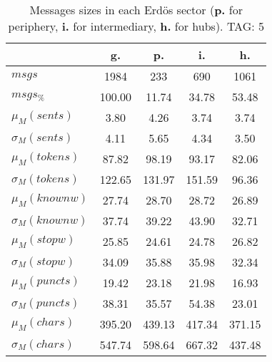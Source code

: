 \begin{table}[h!]
\begin{center}
\begin{tabular}{| l | c | c | c | c |}\hline
 & g. & p. & i. & h. \\\hline
$msgs$ & 1984  & 233  & 690  & 1061 \\\hline
$msgs_{\%}$ & 100.00  & 11.74  & 34.78  & 53.48 \\\hline
$\mu_M(sents)$ & 3.80  & 4.26  & 3.74  & 3.74 \\\hline
$\sigma_M(sents)$ & 4.11  & 5.65  & 4.34  & 3.50 \\\hline
$\mu_M(tokens)$ & 87.82  & 98.19  & 93.17  & 82.06 \\\hline
$\sigma_M(tokens)$ & 122.65  & 131.97  & 151.59  & 96.36 \\\hline
$\mu_M(knownw)$ & 27.74  & 28.70  & 28.72  & 26.89 \\\hline
$\sigma_M(knownw)$ & 37.74  & 39.22  & 43.90  & 32.71 \\\hline
$\mu_M(stopw)$ & 25.85  & 24.61  & 24.78  & 26.82 \\\hline
$\sigma_M(stopw)$ & 34.09  & 35.88  & 35.98  & 32.34 \\\hline
$\mu_M(puncts)$ & 19.42  & 23.18  & 21.98  & 16.93 \\\hline
$\sigma_M(puncts)$ & 38.31  & 35.57  & 54.38  & 23.01 \\\hline
$\mu_M(chars)$ & 395.20  & 439.13  & 417.34  & 371.15 \\\hline
$\sigma_M(chars)$ & 547.74  & 598.64  & 667.32  & 437.48 \\\hline
\end{tabular}
\caption{Messages sizes in each Erd\"os sector ({{\bf p.}} for periphery, {{\bf i.}} for intermediary, {{\bf h.}} for hubs). TAG: 5}
\end{center}
\end{table}